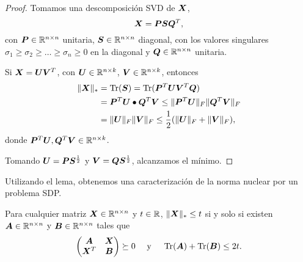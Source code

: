 \begin{proof} Tomamos una descomposición SVD de $\bm{X}$,
$$\bm{X} = \bm{P} \bm{S} \bm{Q}^T,$$
con $\bm{P} \in \mathbb{R}^{n \times n}$ unitaria, $\bm{S} \in \mathbb{R}^{n \times n}$ diagonal, con los valores singulares $\sigma_1 \ge \sigma_2 \ge \dots \ge \sigma_n \ge 0$ en la diagonal y $\bm{Q} \in \mathbb{R}^{n \times n}$ unitaria.

Si $\bm{X} = \bm{U} \bm{V}^T$, con $\bm{U} \in \mathbb{R}^{n \times k}$, $\bm{V} \in \mathbb{R}^{n \times k}$, entonces
\begin{align*}
\|\bm{X}\|_* &= \operatorname{Tr}(\bm{S}) = \operatorname{Tr}(\bm{P}^T \bm{U} \bm{V}^T \bm{Q}) \\
&= \bm{P}^T \bm{U} \bullet \bm{Q}^T \bm{V} \le \|\bm{P}^T \bm{U}\|_F\|\bm{Q}^T \bm{V}\|_F \\
&=  \|\bm{U}\|_F\|\bm{V}\|_F \le \frac{1}{2}(\|\bm{U}\|_F + \|\bm{V}\|_F),
\end{align*}
donde $\bm{P}^T\bm{U}, \bm{Q}^T\bm{V} \in \mathbb{R}^{n \times k}$.

Tomando $\bm{U} = \bm{P} \bm{S}^{\frac12}$ y $\bm{V} = \bm{Q} \bm{S}^{\frac12}$, alcanzamos el mínimo.
\end{proof}

Utilizando el lema, obtenemos una caracterización de la norma nuclear por un problema SDP.

\begin{lemma}
Para cualquier matriz $\bm{X} \in \mathbb{R}^{n \times n}$ y $t \in \mathbb{R}$, $\|\bm{X}\|_* \le t$ si y solo si existen $\bm{A} \in \mathbb{R}^{n \times n}$ y $\bm{B} \in \mathbb{R}^{n \times n}$ tales que
$$
\begin{pmatrix} \bm{A} & \bm{X} \\ \bm{X}^T & \bm{B} \end{pmatrix} \succeq 0 \quad \text{ y } \quad \operatorname{Tr}(\bm{A}) + \operatorname{Tr}(\bm{B}) \le 2t.
$$
\end{lemma}

